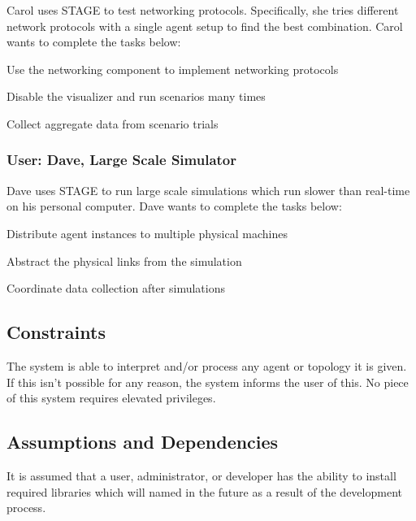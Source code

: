 \documentclass[titlepage]{article}
\begin{document}
Carol uses STAGE to test networking protocols.  Specifically, she tries different network protocols with a single agent
setup to find the best combination.  Carol wants to complete the tasks below:

\begin{itemize*}
    \item Use the networking component to implement networking protocols
    \item Disable the visualizer and run scenarios many times
    \item Collect aggregate data from scenario trials
\end{itemize*}

\subsubsection{User: Dave, Large Scale Simulator%
  \label{bob}%
}

Dave uses STAGE to run large scale simulations which run slower than real-time on his personal computer.  Dave wants to
complete the tasks below:

\begin{itemize*}
    \item Distribute agent instances to multiple physical machines
    \item Abstract the physical links from the simulation
    \item Coordinate data collection after simulations
\end{itemize*}

\subsection{Constraints%
  \label{constraints}%
}

The system is able to interpret and/or process any agent or topology it is given.  If this isn't possible for any reason, the system informs the user of this. No piece of this system requires elevated privileges.


\subsection{Assumptions and Dependencies%
  \label{assumptions-and-dependencies}%
}

It is assumed that a user, administrator, or developer has the ability to install required libraries which will named in the future as a result of the development process.
\end{document}
